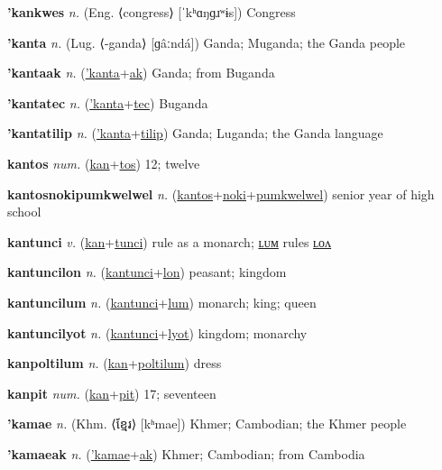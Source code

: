 \textbf{\hypertarget{'kankwes}{'kankwes}} \textit{n.} (Eng. ⟨congress⟩ [ˈkʰɑŋɡɹʷɨs])
Congress

\textbf{\hypertarget{'kanta}{'kanta}} \textit{n.} (Lug. ⟨-ganda⟩ [ɡâːndá])
Ganda; Muganda; the Ganda people

\textbf{\hypertarget{'kantaak}{'kantaak}} \textit{n.} (\hyperlink{'kanta}{'kanta}+\allowbreak \hyperlink{ak}{ak})
Ganda; from Buganda

\textbf{\hypertarget{'kantatec}{'kantatec}} \textit{n.} (\hyperlink{'kanta}{'kanta}+\allowbreak \hyperlink{tec}{tec})
Buganda

\textbf{\hypertarget{'kantatilip}{'kantatilip}} \textit{n.} (\hyperlink{'kanta}{'kanta}+\allowbreak \hyperlink{tilip}{tilip})
Ganda; Luganda; the Ganda language

\textbf{\hypertarget{kantos}{kantos}} \textit{num.} (\hyperlink{kan}{kan}+\allowbreak \hyperlink{tos}{tos})
12; twelve

\textbf{\hypertarget{kantosnokipumkwelwel}{kantosnokipumkwelwel}} \textit{n.} (\hyperlink{kantos}{kantos}+\allowbreak \hyperlink{noki}{noki}+\allowbreak \hyperlink{pumkwelwel}{pumkwelwel})
senior year of high school

\textbf{\hypertarget{kantunci}{kantunci}} \textit{v.} (\hyperlink{kan}{kan}+\allowbreak \hyperlink{tunci}{tunci})
rule as a monarch; \hyperlink{kantuncilum}{ʟᴜᴍ} rules \hyperlink{kantuncilon}{ʟᴏᴧ}

\textbf{\hypertarget{kantuncilon}{kantuncilon}} \textit{n.} (\hyperlink{kantunci}{kantunci}+\allowbreak \hyperlink{lon}{lon})
peasant; kingdom

\textbf{\hypertarget{kantuncilum}{kantuncilum}} \textit{n.} (\hyperlink{kantunci}{kantunci}+\allowbreak \hyperlink{lum}{lum})
monarch; king; queen

\textbf{\hypertarget{kantuncilyot}{kantuncilyot}} \textit{n.} (\hyperlink{kantunci}{kantunci}+\allowbreak \hyperlink{lyot}{lyot})
kingdom; monarchy

\textbf{\hypertarget{kanpoltilum}{kanpoltilum}} \textit{n.} (\hyperlink{kan}{kan}+\allowbreak \hyperlink{poltilum}{poltilum})
dress

\textbf{\hypertarget{kanpit}{kanpit}} \textit{num.} (\hyperlink{kan}{kan}+\allowbreak \hyperlink{pit}{pit})
17; seventeen

\textbf{\hypertarget{'kamae}{'kamae}} \textit{n.} (Khm. ⟨{\khmer{}ខ្មែរ}⟩ [kʰmae])
Khmer; Cambodian; the Khmer people

\textbf{\hypertarget{'kamaeak}{'kamaeak}} \textit{n.} (\hyperlink{'kamae}{'kamae}+\allowbreak \hyperlink{ak}{ak})
Khmer; Cambodian; from Cambodia

